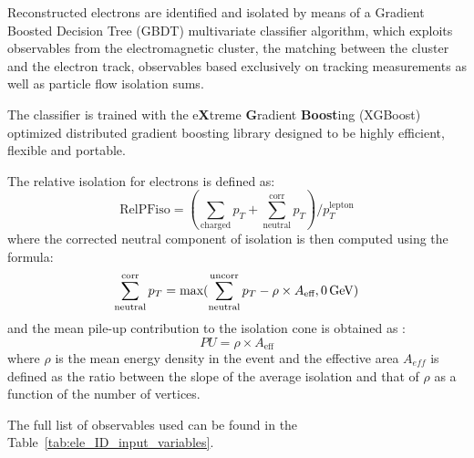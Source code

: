 Reconstructed electrons are identified and isolated by means of a Gradient Boosted Decision Tree (GBDT) multivariate classifier algorithm,
which exploits observables from the electromagnetic cluster, the matching between the cluster and the electron track, observables based exclusively on tracking measurements as well as particle flow isolation sums.

The classifier is trained with the e\textbf{X}treme \textbf{G}radient \textbf{Boost}ing (XGBoost) optimized distributed gradient boosting library
designed to be highly efficient, flexible and portable.

The relative isolation for electrons is defined as: 
\begin{equation}
\text{RelPFiso} = (\sum_{\text{charged}} p_T + \sum^{\text{corr}}_{\text{neutral}} p_T)/p_T^{\text{lepton}}
\label{eqn:elepfrelisoeqn}
\end{equation} 
where the corrected neutral component of isolation is then computed using the formula:
\begin{equation}
\label{eqn:neutralea}
  \sum^{\text{corr}}_{\text{neutral}} p_T = \text{max}(\sum^{\text{uncorr}}_{\text{neutral}} p_T - \rho \times A_\text{eff},0 \,\text{Ge\hspace{-.08em}V})
\end{equation}
and the mean pile-up contribution to the isolation cone is obtained as :
\begin{equation}
  PU =  \rho \times A_\text{eff}
\label{eqn:purho}
\end{equation}
where $\rho$ is the mean energy density in the event and the effective area $A_{eff}$ is defined as the ratio
between the slope of the average isolation and that of $\rho$ as a function of the number of vertices.

The full list of observables used can be found in the Table~\ref{tab:ele_ID_input_variables}.

